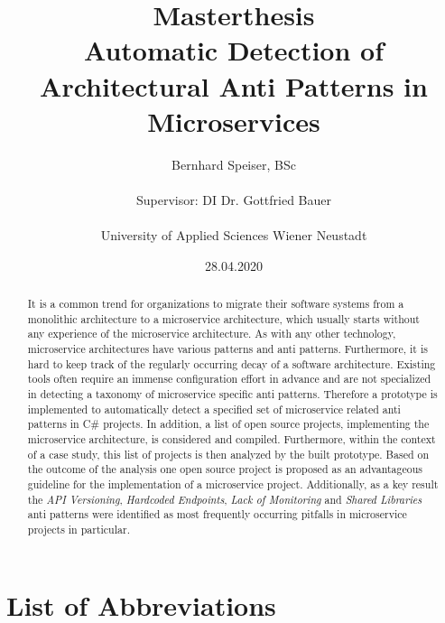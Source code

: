 \documentclass{article}
\title{
Masterthesis \\
\bigskip \textbf{Automatic Detection of Architectural Anti Patterns in Microservices} \bigskip}
\author{Bernhard Speiser, BSc \\\\{Supervisor: DI Dr. Gottfried Bauer}\\\\{University of Applied Sciences Wiener Neustadt}}
\date{28.04.2020}
\begin{document}
\clearpage\maketitle
\thispagestyle{empty}
\pagebreak
\thispagestyle{empty}
\vspace*{\fill}
\begin{abstract}
It is a common trend for organizations to migrate their software systems from a monolithic architecture to a microservice architecture, which usually starts without any experience of the microservice architecture.
As with any other technology, microservice architectures have various patterns and anti patterns.  
Furthermore, it is hard to keep track of the regularly occurring decay of a software architecture.
Existing tools often require an immense configuration effort in advance and are not specialized in detecting a taxonomy of microservice specific anti patterns.
Therefore a prototype is implemented to automatically detect a specified set of microservice related anti patterns in C\# projects.
In addition, a list of open source projects, implementing the microservice architecture, is considered and compiled.
Furthermore, within the context of a case study, this list of projects is then analyzed by the built prototype.
Based on the outcome of the analysis one open source project is proposed as an advantageous guideline for the implementation of a microservice project.
Additionally, as a key result the \textit{API Versioning}, \textit{Hardcoded Endpoints}, \textit{Lack of Monitoring} and \textit{Shared Libraries} anti patterns were identified as most frequently occurring pitfalls in microservice projects in particular.
\end{abstract}
\vspace*{\fill}
\pagebreak


\thispagestyle{empty}
\tableofcontents 
\pagebreak

\section*{List of Abbreviations}
\begin{acronym}[Bash]
\end{acronym}
\end{document}
